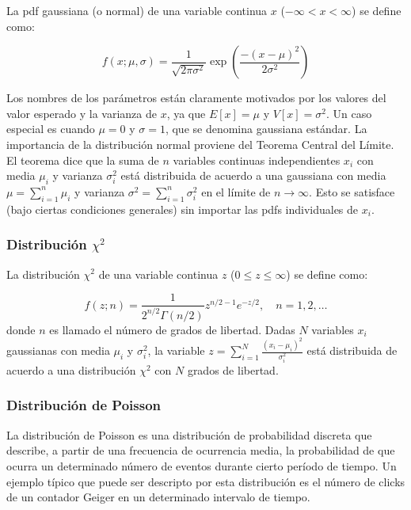 La pdf gaussiana (o normal) de una variable continua $x$ ($-\infty < x < \infty$)
se define como:

\begin{equation}
  f(x;\mu,\sigma) = \frac{1}{\sqrt{2\pi \sigma^2}} \exp \left( \frac{-(x-\mu)^2}{2\sigma^2} \right)
\end{equation}

Los nombres de los parámetros están claramente motivados por los valores del
valor esperado y la varianza de $x$, ya que $E[x] = \mu$ y $V[x] = \sigma^2$. Un
caso especial es cuando $\mu=0$ y $\sigma=1$, que se denomina gaussiana
estándar.
La importancia de la distribución normal proviene del Teorema Central del
Límite. El teorema dice que la suma de $n$ variables continuas independientes
$x_i$ con media $\mu_i$ y varianza $\sigma_i^2$ está distribuida de acuerdo a
una gaussiana con media $\mu = \sum_{i=1}^n \mu_i$ y varianza $\sigma^2 =
\sum_{i=1}^n \sigma_i^2$ en el límite de $n\to\infty$. Esto se satisface (bajo
ciertas condiciones generales) sin importar las pdfs individuales de $x_i$.


\subsubsection{Distribución $\chi^2$}

La distribución $\chi^2$ de una variable continua $z$ ($0 \leq z \leq \infty$) se
define como:

\begin{equation}
  f(z;n) = \frac{1}{2^{n/2}\Gamma(n/2)} z^{n/2-1} e^{-z/2}, \quad n=1,2,\ldots
\end{equation}
%
donde $n$ es llamado el número de grados de libertad.
Dadas $N$ variables $x_i$ gaussianas con media $\mu_i$ y $\sigma_i^2$, la
variable $z = \sum_{i=1}^{N} \frac{(x_i-\mu_i)^2}{\sigma_i^2}$ está distribuida
de acuerdo a una distribución $\chi^2$ con $N$ grados de libertad.


\subsubsection{Distribución de Poisson}

La distribución de Poisson es una distribución de probabilidad discreta que
describe, a partir de una frecuencia de ocurrencia media, la probabilidad de que
ocurra un determinado número de eventos durante cierto período de tiempo. Un
ejemplo típico que puede ser descripto por esta distribución es el número de
clicks de un contador Geiger en un determinado intervalo de tiempo.

